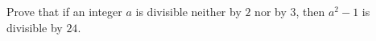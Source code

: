 Prove that if an integer $a$ is divisible neither by $2$ nor by $3$, then $a^2-1$ is divisible by $24$.
